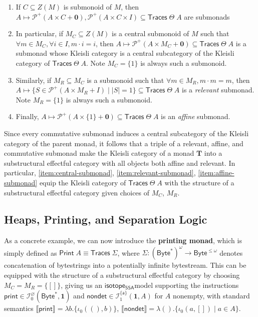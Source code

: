 \documentclass[acmsmall,screen,review]{acmart}
\newcommand{\mc}[1]{\ensuremath{\mathcal{#1}}}
\newcommand{\mb}[1]{\ensuremath{\mathbf{#1}}}
\newcommand{\ms}[1]{\ensuremath{\mathsf{#1}}}
\newcommand{\taff}{{\{\ms{a}\}}}
\newcommand{\dnt}[1]{\llbracket{#1}\rrbracket}
\newcommand{\isotopessa}{\ms{isotope_{SSA}}}
\begin{document}
\begin{enumerate}
  \item If \(C \subseteq Z(M)\) is submonoid of \(M\), then \(A \mapsto
  \mc{P}^+(A \times C + \mb{0}), \mc{P}^+(A \times C \times I) \subseteq
  \ms{Traces}\;\Theta\;A\) are submonads
  \item In particular, if \(M_C \subseteq Z(M)\) is a central submonoid of \(M\)
  such that \(\forall m \in M_C, \forall i \in I, m \cdot i = i\), then \(A
  \mapsto \mc{P}^+(A \times M_C + \mb{0}) \subseteq \ms{Traces}\;\Theta\;A\) is
  a submonad whose Kleisli category is a central subcategory of the Kleisli
  category of \(\ms{Traces}\;\Theta\;A\). Note \(M_C = \{1\}\) is always such a
  submonoid.
  \label{item:central-submonad}
  \item Similarly, if \(M_R \subseteq M_C\) is a submonoid such that \(\forall m
  \in M_R, m \cdot m = m\), then \(A \mapsto \{S \in \mc{P}^+(A \times M_R + I)
  \mid |S| = 1\} \subseteq \ms{Traces}\;\Theta\;A\) is a \textit{relevant}
  submonad. Note \(M_R = \{1\}\) is always such a submonoid.
  \label{item:relevant-submonad}
  \item Finally, \(A \mapsto \mc{P}^+(A \times \{1\} + \mb{0}) \subseteq
  \ms{Traces}\;\Theta\;A\) is an \textit{affine} submonad.
  \label{item:affine-submonad}
\end{enumerate}
Since every commutative submonad induces a central subcategory of the Kleisli
category of the parent monad, it follows that a triple of a relevant, affine,
and commutative submonad make the Kleisli category of a monad \(\mb{T}\) into a
substructural effectful category with all objects both affine and relevant. In
particular, \ref{item:central-submonad}, \ref{item:relevant-submonad},
\ref{item:affine-submonad} equip the Kleisli category of
\(\ms{Traces}\;\Theta\;A\) with the structure of a substructural effectful
category given choices of \(M_C\), \(M_R\).

\subsection{Heaps, Printing, and Separation Logic}

\label{ssec:separation}

As a concrete example, we can now introduce the \textbf{printing monad}, which
is simply defined as \(\ms{Print}\;A \equiv \ms{Traces}\;\Sigma\), where
\(\Sigma: (\ms{Byte}^*)^\omega \to \ms{Byte}^{\leq \omega}\) denotes
concatenation of bytestrings into a potentially infinite bytestream. This can be
equipped with the structure of a substructural effectful category by choosing
\(M_C = M_R = \{[]\}\), giving us an \isotopessa model supporting the
instructions \(\ms{print} \in \mc{I}^\varnothing_0(\ms{Byte}^*, \mb{1})\) and
\(\ms{nondet} \in \mc{I}^\taff_1(\mb{1}, A)\) for \(A\) nonempty, with standard
semantics \(\dnt{\ms{print}} = \lambda b.\{\iota_0 ((), b)\}\),
\(\dnt{\ms{nondet}} = \lambda (). \{\iota_0 (a, []) \mid a \in A\}\).
\end{document}
